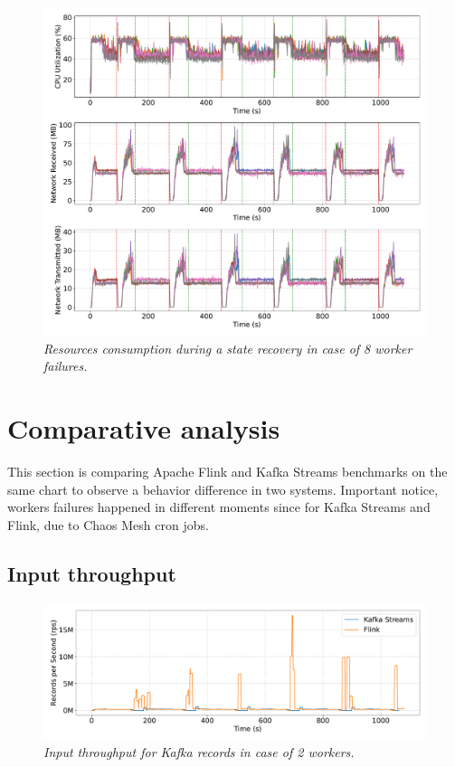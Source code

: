 \begin{figure}[H]
    \centering
    \includegraphics[width=1\textwidth]{figures/flink-8pods/flink_8_pods_resources}
    \caption{\textit{Resources consumption during a state recovery in case of 8 worker failures.}}
    \label{fig:flink-8pods-resource}
\end{figure}


\newpage
\section{Comparative analysis}\label{subsec:comparative-analysis}
This section is comparing Apache Flink and Kafka Streams benchmarks
on the same chart to observe a behavior difference in two systems.
Important notice, workers failures happened in different moments since
for Kafka Streams and Flink, due to Chaos Mesh cron jobs.

\subsection{Input throughput}\label{subsec:input-throughtput}

\begin{figure}[H]
    \centering
    \includegraphics[width=1\textwidth]{figures/kafka-flink/input-throughput-2pod-kafka-flink}
    \caption{\textit{Input throughput for Kafka records in case of 2 workers.}}
    \label{fig:kafka-flink-input-2}
\end{figure}


